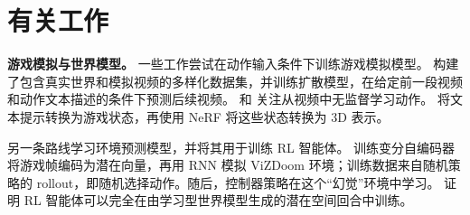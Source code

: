 \documentclass{article} %
\begin{document}
\begin{table}[t]
\caption{\textbf{不同难度下的性能。} 比较使用智能体生成数据和随机生成数据训练的模型，在 easy、medium、hard 三个划分上的表现。easy 和 medium 各有 112 项，hard 有 232 项。指标在 3 秒后每条轨迹的单帧上计算。\label{table:difficulty_split_performance}}
\centering
\vspace{0.05in}
\end{table}


\section{有关工作}
\label{related_work}

\textbf{游戏模拟与世界模型。} 一些工作尝试在动作输入条件下训练游戏模拟模型。\cite{yang2023learning} 构建了包含真实世界和模拟视频的多样化数据集，并训练扩散模型，在给定前一段视频和动作文本描述的条件下预测后续视频。\cite{menapace2021playablevideogeneration} 和 \cite{bruce2024genie} 关注从视频中无监督学习动作。\cite{Menapace_2024} 将文本提示转换为游戏状态，再使用 NeRF 将这些状态转换为 3D 表示。

另一条路线学习环境预测模型，并将其用于训练 RL 智能体。\cite{ha2018worldmodels} 训练变分自编码器~\citep{Kingma2014} 将游戏帧编码为潜在向量，再用 RNN 模拟 ViZDoom 环境；训练数据来自随机策略的 rollout，即随机选择动作。随后，控制器策略在这个“幻觉”环境中学习。\cite{hafner2020dreamer} 证明 RL 智能体可以完全在由学习型世界模型生成的潜在空间回合中训练。
\end{document}
